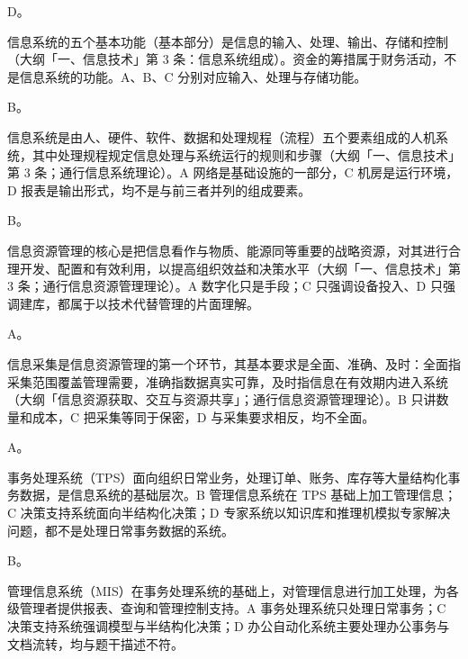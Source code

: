 \documentclass[a4paper,11pt]{article}
\begin{document}


\q D。\begin{analysis}信息系统的五个基本功能（基本部分）是信息的输入、处理、输出、存储和控制（大纲「一、信息技术」第 3 条：信息系统组成）。资金的筹措属于财务活动，不是信息系统的功能。A、B、C 分别对应输入、处理与存储功能。\end{analysis}

\q B。\begin{analysis}信息系统是由人、硬件、软件、数据和处理规程（流程）五个要素组成的人机系统，其中处理规程规定信息处理与系统运行的规则和步骤（大纲「一、信息技术」第 3 条；通行信息系统理论）。A 网络是基础设施的一部分，C 机房是运行环境，D 报表是输出形式，均不是与前三者并列的组成要素。\end{analysis}

\q B。\begin{analysis}信息资源管理的核心是把信息看作与物质、能源同等重要的战略资源，对其进行合理开发、配置和有效利用，以提高组织效益和决策水平（大纲「一、信息技术」第 3 条；通行信息资源管理理论）。A 数字化只是手段；C 只强调设备投入、D 只强调建库，都属于以技术代替管理的片面理解。\end{analysis}

\q A。\begin{analysis}信息采集是信息资源管理的第一个环节，其基本要求是全面、准确、及时：全面指采集范围覆盖管理需要，准确指数据真实可靠，及时指信息在有效期内进入系统（大纲「信息资源获取、交互与资源共享」；通行信息资源管理理论）。B 只讲数量和成本，C 把采集等同于保密，D 与采集要求相反，均不全面。\end{analysis}

\q A。\begin{analysis}事务处理系统（TPS）面向组织日常业务，处理订单、账务、库存等大量结构化事务数据，是信息系统的基础层次。B 管理信息系统在 TPS 基础上加工管理信息；C 决策支持系统面向半结构化决策；D 专家系统以知识库和推理机模拟专家解决问题，都不是处理日常事务数据的系统。\end{analysis}

\q B。\begin{analysis}管理信息系统（MIS）在事务处理系统的基础上，对管理信息进行加工处理，为各级管理者提供报表、查询和管理控制支持。A 事务处理系统只处理日常事务；C 决策支持系统强调模型与半结构化决策；D 办公自动化系统主要处理办公事务与文档流转，均与题干描述不符。\end{analysis}
\end{document}
